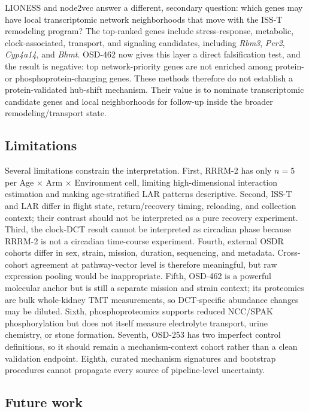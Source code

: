 \documentclass[11pt]{article}
\newcommand{\gene}[1]{\textit{#1}}
\begin{document}
LIONESS and node2vec answer a different, secondary question: which genes may have local transcriptomic network neighborhoods that move with the ISS-T remodeling program? The top-ranked genes include stress-response, metabolic, clock-associated, transport, and signaling candidates, including \gene{Rbm3}, \gene{Per2}, \gene{Cyp4a14}, and \gene{Bhmt}. OSD-462 now gives this layer a direct falsification test, and the result is negative: top network-priority genes are not enriched among protein- or phosphoprotein-changing genes. These methods therefore do not establish a protein-validated hub-shift mechanism. Their value is to nominate transcriptomic candidate genes and local neighborhoods for follow-up inside the broader remodeling/transport state.

\subsection{Limitations}

Several limitations constrain the interpretation. First, RRRM-2 has only $n=5$ per Age $\times$ Arm $\times$ Environment cell, limiting high-dimensional interaction estimation and making age-stratified LAR patterns descriptive. Second, ISS-T and LAR differ in flight state, return/recovery timing, reloading, and collection context; their contrast should not be interpreted as a pure recovery experiment. Third, the clock-DCT result cannot be interpreted as circadian phase because RRRM-2 is not a circadian time-course experiment. Fourth, external OSDR cohorts differ in sex, strain, mission, duration, sequencing, and metadata. Cross-cohort agreement at pathway-vector level is therefore meaningful, but raw expression pooling would be inappropriate. Fifth, OSD-462 is a powerful molecular anchor but is still a separate mission and strain context; its proteomics are bulk whole-kidney TMT measurements, so DCT-specific abundance changes may be diluted. Sixth, phosphoproteomics supports reduced NCC/SPAK phosphorylation but does not itself measure electrolyte transport, urine chemistry, or stone formation. Seventh, OSD-253 has two imperfect control definitions, so it should remain a mechanism-context cohort rather than a clean validation endpoint. Eighth, curated mechanism signatures and bootstrap procedures cannot propagate every source of pipeline-level uncertainty.

\subsection{Future work}
\end{document}

